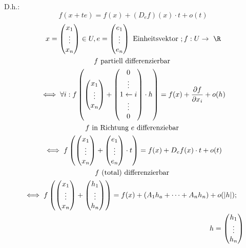 D.h.:
\[ f(x + te) = f(x) + (D_e f)(x) \cdot t + o(t) \]
\begin{gather*}
	x = \begin{pmatrix} x_1 \\ \vdots \\ x_n \end{pmatrix} \in U , e = \begin{pmatrix} e_1 \\ \vdots \\ e_n \end{pmatrix} \text{ Einheitsvektor } ; f: U \rightarrow \R \\
	f \text{ partiell differenzierbar } \\
	\iff \forall i : f\left( \begin{pmatrix} x_1 \\ \vdots \\ x_n \end{pmatrix} + \begin{pmatrix} 0 \\ \vdots \\ 1 \leftarrow i \\ \vdots \\ 0 \end{pmatrix} \cdot h \right) = f(x) + \frac{\partial f}{\partial x_i} + o(h) \\
	f \text{ in Richtung $e$ differenziebar } \\
	\iff f\left( \begin{pmatrix} x_1 \\ \vdots \\ x_n \end{pmatrix} + \begin{pmatrix} e_1 \\ \vdots \\ e_n \end{pmatrix} \cdot t \right) = f(x) + D_e f(x) \cdot t + o(t) \\
	f \text{ (total) differenzierbar } \\
	\begin{multlined}
		\iff f\left( \begin{pmatrix} x_1 \\ \vdots \\ x_n \end{pmatrix} + \begin{pmatrix} h_1 \\ \vdots \\ h_n \end{pmatrix} \right) = f(x) + ( A_1 h_a + \dots + A_n h_n ) + o( \abs{h} ) ; \\
		h =  \begin{pmatrix} h_1 \\ \vdots \\ h_n \end{pmatrix}
	\end{multlined}
\end{gather*}
